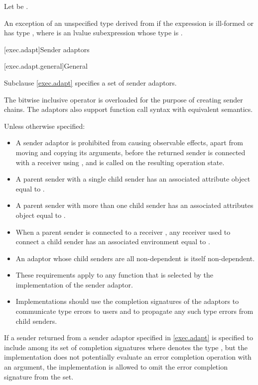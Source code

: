 \begin{itemdescr}
\pnum
Let  be .

\pnum
\throws
An exception of an unspecified type derived from  if
the expression  is ill-formed or has type , where
 is an lvalue subexpression whose type is .
\end{itemdescr}

[exec.adapt]{Sender adaptors}

[exec.adapt.general]{General}

\pnum
Subclause \ref{exec.adapt} specifies a set of sender adaptors.

\pnum
The bitwise inclusive  operator is overloaded
for the purpose of creating sender chains.
The adaptors also support function call syntax with equivalent semantics.

\pnum
Unless otherwise specified:
\begin{itemize}
\item
A sender adaptor is prohibited from causing observable effects,
apart from moving and copying its arguments,
before the returned sender is connected with a receiver using ,
and  is called on the resulting operation state.
\item
A parent sender with a single child sender  has
an associated attribute object equal to
.
\item
A parent sender with more than one child sender has
an associated attributes object equal to .
\item
When a parent sender is connected to a receiver ,
any receiver used to connect a child sender has
an associated environment equal to .
\item
An adaptor whose child senders are all non-dependent
is itself non-dependent.
\item
These requirements apply to any function
that is selected by the implementation of the sender adaptor.
\item
 \recommended
Implementations should use
the completion signatures of the adaptors
to communicate type errors to users and
to propagate any such type errors from child senders.
\end{itemize}

\pnum
If a sender returned from a sender adaptor specified in \ref{exec.adapt}
is specified to include 
among its set of completion signatures
where  denotes the type ,
but the implementation does not potentially evaluate
an error completion operation with an  argument,
the implementation is allowed to omit
the  error completion signature from the set.

